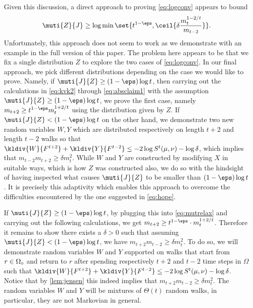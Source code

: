 Given this discussion, a direct approach to proving 
\autoref{eq:logconv} appears to bound 
\begin{align}
\muti{Z}{J}\ge \log \min\set{t^{1-\eps}, 
\ceil{\delta\frac{m_t^{1-2/t}}{m_{t-2}}}}.
\label{eq:hope}
\end{align}
Unfortunately, this approach does not seem to 
work as we demonstrate with an example in the full version of this paper.
The problem here appears to be that we 
fix a single distribution $Z$ to explore the
two cases of \autoref{eq:logconv}. 
In our final approach, we pick different 
distributions depending on the case we would like 
to prove. Namely, if 
$\muti{J}{Z}\ge (1-\eps) \log t$, then carrying 
out the calculations in \autoref{eq:kvk2} through 
\ref{eq:absclaim1} with the assumption 
$\muti{J}{Z}\ge (1-\eps) \log t$, we prove 
the first case, namely $m_{t+2}\ge t^{1-\eps}m_t^{1+2/t}$ 
using the distribution given by $Z$.
If $\muti{J}{Z}< (1-\eps) \log t$ on the other hand, 
we demonstrate two new random variables $W,Y$ which are 
distributed respectively on length $t+2$ and length $t-2$ 
walks so that 
  $\kldiv{W}{F^{t+2}} + \kldiv{Y}{F^{t-2}}\le 
    -2\log S^t(\mu, \nu) - \log \delta$,
which implies that $m_{t-2}m_{t+2}\ge \delta m_t^2$.
While $W$ and $Y$ are constructed by modifying $X$ in 
suitable ways, which is how $Z$ was constructed also,
we do so with the hindsight of 
having inspected what causes $\muti{J}{Z}$ to be smaller
than $(1-\eps)\log t$. It is precisely this adaptivity
which enables this approach to overcome the difficulties
encountered by the one suggested in 
\autoref{eq:hope}.

If $\muti{J}{Z}\ge (1-\eps) \log t$, by plugging this into 
\autoref{eq:mutrelax} and carrying out the 
following calculations, 
we get $m_{t+2} \ge t^{1-\eps}\cdot m_t^{1+2/t}$.
Therefore it remains to show there exists a $\delta>0$
such that assuming $\muti{J}{Z} < (1-\eps) \log t$,
we have
$m_{t+2}m_{t-2}\ge \delta m_t^2$.
To do so, we will demonstrate random variables 
$W$ and $Y$
supported on walks that start from $r\in \Omega_\circ$
and return to $r$ 
after spending respectively $t+2$ and $t-2$ time 
steps in 
$\Omega$ such that $\kldiv{W}{F^{t+2}} + 
\kldiv{Y}{F^{t-2}}\le -2\log S^t(\mu, \nu) - 
\log \delta$. 
Notice that by \autoref{lem:jensen} this indeed implies
that $m_{t+2}m_{t-2}\ge \delta m_t^2$.
The random variables $W$ and $Y$ will be mixtures of 
$\Theta(t)$ random walks, in particular, they are not 
Markovian in general.

